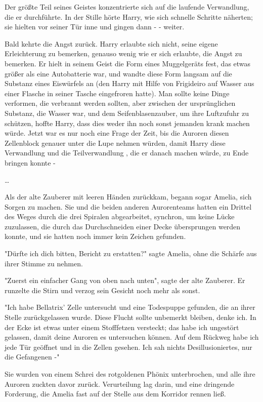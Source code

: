 {Der größte Teil seines Geistes konzentrierte sich auf die laufende Verwandlung, die er durchführte. In der Stille hörte Harry, wie sich schnelle Schritte näherten; sie hielten vor seiner Tür inne und gingen dann - - weiter.

Bald kehrte die Angst zurück. Harry erlaubte sich nicht, seine eigene Erleichterung zu bemerken, genauso wenig wie er sich erlaubte, die Angst zu bemerken. Er hielt in seinem Geist die Form eines Muggelgeräts fest, das etwas größer als eine Autobatterie war, und wandte diese Form langsam auf die Substanz eines Eiswürfels an (den Harry mit Hilfe von Frigideiro auf Wasser aus einer Flasche in seiner Tasche eingefroren hatte). Man sollte keine Dinge verformen, die verbrannt werden sollten, aber zwischen der ursprünglichen Substanz, die Wasser war, und dem Seifenblasenzauber, um ihre Luftzufuhr zu schützen, hoffte Harry, dass dies weder ihn noch sonst jemanden krank machen würde. Jetzt war es nur noch eine Frage der Zeit, bis die Auroren diesen Zellenblock genauer unter die Lupe nehmen würden, damit Harry diese Verwandlung und die Teilverwandlung , die er danach machen würde, zu Ende bringen konnte -

…

Als der alte Zauberer mit leeren Händen zurückkam, begann sogar Amelia, sich Sorgen zu machen. Sie und die beiden anderen Aurorenteams hatten ein Drittel des Weges durch die drei Spiralen abgearbeitet, synchron, um keine Lücke zuzulassen, die durch das Durchschneiden einer Decke übersprungen werden konnte, und sie hatten noch immer kein Zeichen gefunden.

"Dürfte ich dich bitten, Bericht zu erstatten?" sagte Amelia, ohne die Schärfe aus ihrer Stimme zu nehmen.

"Zuerst ein einfacher Gang von oben nach unten", sagte der alte Zauberer. Er runzelte die Stirn und verzog sein Gesicht noch mehr als sonst.

"Ich habe Bellatrix' Zelle untersucht und eine Todespuppe gefunden, die an ihrer Stelle zurückgelassen wurde. Diese Flucht sollte unbemerkt bleiben, denke ich. In der Ecke ist etwas unter einem Stofffetzen versteckt; das habe ich ungestört gelassen, damit deine Auroren es untersuchen können. Auf dem Rückweg habe ich jede Tür geöffnet und in die Zellen gesehen. Ich sah nichts Desillusioniertes, nur die Gefangenen -"

Sie wurden von einem Schrei des rotgoldenen Phönix unterbrochen, und alle ihre Auroren zuckten davor zurück. Verurteilung lag darin, und eine dringende Forderung, die Amelia fast auf der Stelle aus dem Korridor rennen ließ.

}
